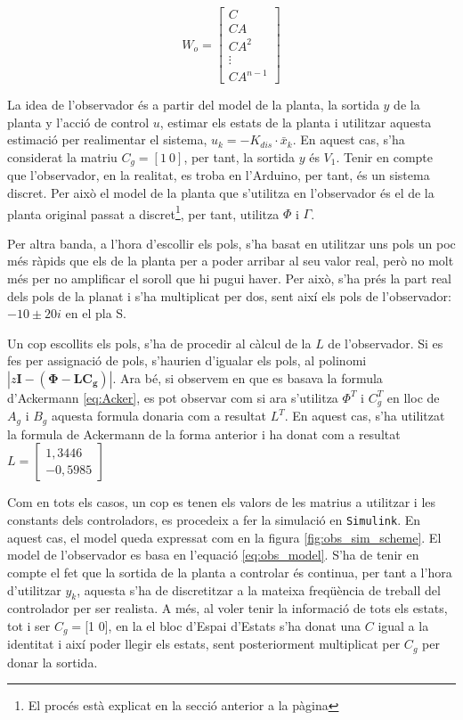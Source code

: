 \documentclass[12pt,a4paper,final,twoside,openright]{report}
\begin{document}
\begin{equation}\label{eq:observabilitat}
W_o = \begin{bmatrix}
C\\
C A\\
C A^2\\
\vdots\\
C A^{n-1}
\end{bmatrix}
\end{equation}

La idea de l'observador és a partir del model de la planta, la sortida $y$ de la planta y l'acció de control $u$, estimar els estats de la planta i utilitzar aquesta estimació per realimentar el sistema, $u_k = -K_{dis}\cdot\bar{x}_k$. En aquest cas, s'ha considerat la matriu $C_g=[1 ~ 0]$, per tant, la sortida $y$ és $V_1$. Tenir en compte que l'observador, en la realitat, es troba en l'Arduino, per tant, és un sistema discret. Per això el model de la planta que s'utilitza en l'observador és el de la planta original passat a discret\footnote{El procés està explicat en la secció anterior a la pàgina \pageref{pag:trans_phi_gam}}, per tant, utilitza $\Phi$ i $\Gamma$.

Per altra banda, a l'hora d'escollir els pols, s'ha basat en utilitzar uns pols un poc més ràpids que els de la planta per a poder arribar al seu valor real, però no molt més per no amplificar el soroll que hi pugui haver. Per això, s'ha prés la part real dels pols de la planat i s'ha multiplicat per dos, sent així els pols de l'observador: $-10\pm20i$ en el pla S. 

Un cop escollits els pols, s'ha de procedir al càlcul de la $L$ de l'observador. Si es fes per assignació de pols, s'haurien d'igualar els pols, al polinomi $|z\mathbf{I}-(\mathbf{\Phi} - \mathbf{L C_g})|$. Ara bé, si observem en que es basava la formula d'Ackermann \eqref{eq:Acker}, es pot observar com si ara s'utilitza $\Phi^T$ i $C_g^T$ en lloc de $A_g$ i $B_g$ aquesta formula donaria com a resultat $L^T$. En aquest cas, s'ha utilitzat la formula de Ackermann de la forma anterior i ha donat com a resultat $L=\begin{bmatrix}
1,3446\\
-0,5985
\end{bmatrix}$

Com en tots els casos, un cop es tenen els valors de les matrius a utilitzar i les constants dels controladors, es procedeix a fer la simulació en \texttt{Simulink}. En aquest cas, el model queda expressat com en la figura \ref{fig:obs_sim_scheme}. El model de l'observador es basa en l'equació \eqref{eq:obs_model}. S'ha de tenir en compte el fet que la sortida de la planta a controlar és continua, per tant a l'hora d'utilitzar $y_k$, aquesta s'ha de discretitzar a la mateixa freqüència de treball del controlador per ser realista. A més, al voler tenir la informació de tots els estats, tot i ser $C_g=$[1 0], en la el bloc d'Espai d'Estats s'ha donat una $C$ igual a la identitat i així poder llegir els estats, sent posteriorment multiplicat per  $C_g$ per donar la sortida.
\end{document}
